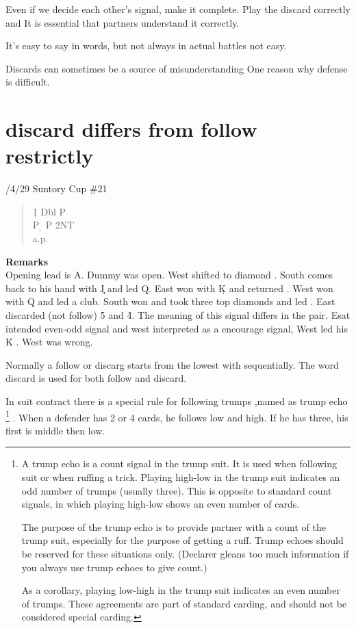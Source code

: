 
Even if we decide each other's signal, make it complete.
Play the discard correctly and
It is essential that partners understand it correctly.

It's easy to say in words, but not always in actual battles
not easy.

Discards can sometimes be a source of misunderstanding
One reason why defense is difficult.

\section{discard differs from follow restrictly}
/4/29 Suntory Cup \#21
\begin{quote}
%
  {}%
  {}
  {}%
  {}%
\end{quote}
\begin{quote}
\begin{bidding}
1\d  \> Dbl   \> P \c \\
P \d \> P \> 2NT \\
a.p.
\end{bidding}
\end{quote}
{\bf Remarks}\\

Opening lead is \s A. Dummy was open.  West shifted to diamond .
South comes back to his hand with \c J  and led \d Q. East won with
\d K and returned . West won with \s Q and led a club.
South won and took three top diamonds and led . East discarded
(not follow) \h 5 and \h 4. The meaning of this signal differs
in the pair. Esat intended even-odd signal and west interpreted as
a encourage signal, West led his \h K . West was wrong.

Normally a follow or discarg starts from the lowest with 
sequentially. The word discard is used for both follow and discard.

In suit contract there is a special rule for following trumps
,named as trump echo \footnote{
A trump echo is a count signal in the trump suit. It is used when following suit or when ruffing a trick. Playing high-low in the trump suit indicates an odd number of trumps (usually three). This is opposite to standard count signals, in which playing high-low shows an even number of cards.

The purpose of the trump echo is to provide partner with a count of the trump suit, especially for the purpose of getting a ruff. Trump echoes should be reserved for these situations only. (Declarer gleans too much information if you always use trump echoes to give count.)

As a corollary, playing low-high in the trump suit indicates an even number of trumps. These agreements are part of standard carding, and should not be considered special carding.

}
. When a defender has 2 or 4 cards,
he follows low and high.
If he has three, his first is middle then low.

